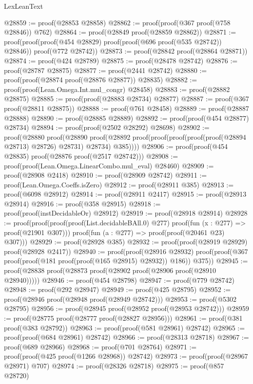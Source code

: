 \begin{lexlean}{LexLeanText}
\begin{coremodule}
@28859 := proof(@28853 @28858)
@28862 := proof(proof(@367 proof(@758 @28846)) @762)
@28864 := proof(@28849 proof(@28859 @28862))
@28871 := proof(proof(proof(@454 @28829) proof(proof(@696 proof(@535 @28742)) @28846))
      proof(@772 @28742))
@28873 := proof(@28842 proof(@28864 @28871))
@28874 := proof(@424 @28789)
@28875 := proof(@28478 @28742)
@28876 := proof(@28787 @28875)
@28877 := proof(@2441 @28742)
@28880 := proof(proof(@28874 proof(@28876 @28877)) @28835)
@28882 := proof(proof(Lean.Omega.Int.mul_congr) @28458)
@28883 := proof(@28882 @28875)
@28885 := proof(proof(@28883 @28734) @28877)
@28887 := proof(@367 proof(@28811 @28875))
@28888 := proof(@761 @28458)
@28889 := proof(@28887 @28888)
@28890 := proof(@28885 @28889)
@28892 := proof(proof(@454 @28877) @28734)
@28894 := proof(proof(@2502 @28292) @28698)
@28902 := proof(@28880
      proof(@28890
          proof(@28892 proof(proof(proof(proof(proof(@28894 @28713) @28726) @28731) @28734) @385))))
@28906 := proof(proof(@454 @28835) proof(@28876 proof(@2517 @28742)))
@28908 := proof(proof(Lean.Omega.LinearCombo.mul_eval) @28460)
@28909 := proof(@28908 @2418)
@28910 := proof(@28909 @28742)
@28911 := proof(Lean.Omega.Coeffs.isZero)
@28912 := proof(@28911 @385)
@28913 := proof(@6098 @28912)
@28914 := proof(@28911 @2417)
@28915 := proof(@28913 @28914)
@28916 := proof(@358 @28915)
@28918 := proof(proof(instDecidableOr) @28912)
@28919 := proof(@28918 @28914)
@28928 := proof(proof(proof(proof(List.decidableBAll.{0}) @277)
        proof(fun (x : @277) => proof(@21901 @307)))
      proof(fun (a : @277) => proof(proof(@20461 @23) @307)))
@28929 := proof(@28928 @385)
@28932 := proof(proof(@28919 @28929) proof(@28928 @2417))
@28940 := proof(proof(@28916 @28932)
      proof(proof(@367 proof(proof(@181 proof(proof(@165 @28915) @28932)) @186)) @375))
@28945 := proof(@28838 proof(@28873 proof(@28902 proof(@28906 proof(@28910 @28940)))))
@28946 := proof(@454 @28798)
@28947 := proof(@779 @28742)
@28948 := proof(@292 @28947)
@28949 := proof(@425 @28795)
@28952 := proof(@28946 proof(@28948 proof(@28949 @28742)))
@28953 := proof(@5302 @28795)
@28956 := proof(@28945 proof(@28952 proof(@28953 @28742)))
@28959 := proof(@28775 proof(@28777 proof(@28827 @28956)))
@28961 := proof(@381 proof(@383 @28792))
@28963 := proof(proof(@581 @28961) @28742)
@28965 := proof(proof(@684 @28961) @28742)
@28966 := proof(@28313 @28718)
@28967 := proof(@689 @28966)
@28968 := proof(@701 @28764)
@28971 := proof(proof(@425 proof(@1266 @28968)) @28742)
@28973 := proof(proof(@28967 @28971) @707)
@28974 := proof(@28326 @28718)
@28975 := proof(@857 @28720)

\end{coremodule}
\end{lexlean}
